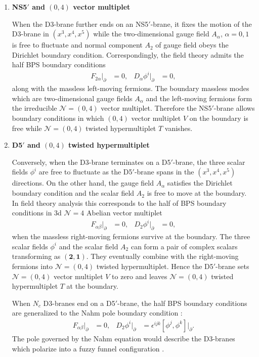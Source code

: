 \documentclass{article}
\numberwithin{equation}{section}
\begin{document}
\begin{enumerate}

\item \textbf{NS5$'$ and $(0,4)$ vector multiplet}

When the D3-brane further ends on an NS5$'$-brane, 
it fixes the motion of the D3-brane in $(x^{3}, x^{4}, x^{5})$ 
while the two-dimensional gauge field $A_{\alpha}$, $\alpha=0,1$ is free to fluctuate 
and normal component $A_{2}$ of gauge field obeys the Dirichlet boundary condition. 
Correspondingly, 
the field theory admits the half BPS boundary conditions 
\begin{align}
\label{half_v1}
F_{2\alpha} |_{\partial}&=0,& D_{\alpha}\phi^{i}|_{\partial}&=0, 
\end{align}
along with the massless left-moving fermions.  
The boundary massless modes which are 
two-dimensional gauge fields $A_{\alpha}$ and the left-moving fermions form the irreducible $\mathcal{N}=(0,4)$ vector multiplet. 
Therefore the NS5$'$-brane allows boundary conditions 
in which $(0,4)$ vector multiplet $V$ on the boundary is free 
while $\mathcal{N}=(0,4)$ twisted hypermultiplet $T$ vanishes. 

\item \textbf{D5$'$ and $(0,4)$ twisted hypermultiplet}

Conversely, when the D3-brane terminates on a D5$'$-brane, 
the three scalar fields $\phi^{i}$ are free to fluctuate 
as the D5$'$-brane spans in the $(x^{3}, x^{4}, x^{5})$ directions. 
On the other hand, the gauge field $A_{\alpha}$ 
satisfies the Dirichlet boundary condition and 
the scalar field $A_{2}$ is free to move at the boundary. 
In field theory analysis this corresponds to the half of BPS boundary conditions in 
3d $\mathcal{N}=4$ Abelian vector multiplet 
\begin{align}
\label{half_v2}
F_{\alpha\beta}|_{\partial}&=0,& D_{2}\phi^{i}|_{\partial}&=0, 
\end{align}
when the massless right-moving fermions survive at the boundary. 
The three scalar fields $\phi^{i}$ and the scalar field $A_{2}$ can form a pair of 
complex scalars transforming as $(\bm{2},\bm{1})$. 
They eventually combine with the right-moving fermions into $\mathcal{N}=(0,4)$ twisted hypermultiplet. 
Hence the D5$'$-brane sets $\mathcal{N}=(0,4)$ vector multiplet $V$ to zero 
and leaves $\mathcal{N}=(0,4)$ twisted hypermultiplet $T$ at the boundary. 

When $N_{c}$ D3-branes end on a D5$'$-brane, 
the half BPS boundary conditions are generalized to the Nahm pole boundary condition \cite{Chung:2016pgt}:
\begin{align}
\label{nahm_BC}
F_{\alpha\beta} |_{\partial}&=0,& 
D_{2}\phi^{i}|_{\partial}&=\epsilon^{ijk}[\phi^{j},\phi^{k}]|_{\partial}.
\end{align}
The pole governed by the Nahm equation would  
describe the D3-branes which polarize into a fuzzy funnel configuration  
\cite{Callan:1997kz,Constable:1999ac}. 



\end{enumerate}
\end{document}
